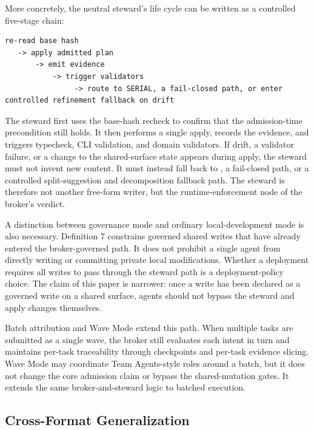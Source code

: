 \documentclass[9pt,letterpaper]{extarticle}
\begin{document}
More concretely, the neutral steward's life cycle can be written as a controlled five-stage chain:

\begin{paperAlgoBox}
\begin{Verbatim}[breaklines=true,fontsize=\scriptsize]
re-read base hash
   -> apply admitted plan
       -> emit evidence
           -> trigger validators
                -> route to SERIAL, a fail-closed path, or enter controlled refinement fallback on drift
\end{Verbatim}
\end{paperAlgoBox}

The steward first uses the base-hash recheck to confirm that the admission-time precondition still holds. It then performs a single apply, records the evidence, and triggers typecheck, CLI validation, and domain validators. If drift, a validator failure, or a change to the shared-surface state appears during apply, the steward must not invent new content. It must instead fall back to \texttt{}, a fail-closed path, or a controlled split-suggestion and decomposition fallback path. The steward is therefore not another free-form writer, but the runtime-enforcement node of the broker's verdict.

A distinction between governance mode and ordinary local-development mode is also necessary. Definition 7 constrains governed shared writes that have already entered the broker-governed path. It does not prohibit a single agent from directly writing or committing private local modifications. Whether a deployment requires all writes to pass through the steward path is a deployment-policy choice. The claim of this paper is narrower: once a write has been declared as a governed write on a shared surface, agents should not bypass the steward and apply changes themselves.

Batch attribution and Wave Mode extend this path. When multiple tasks are submitted as a single wave, the broker still evaluates each intent in turn and maintains per-task traceability through checkpoints and per-task evidence slicing. Wave Mode may coordinate Team Agents-style roles around a batch, but it does not change the core admission claim or bypass the shared-mutation gates. It extends the same broker-and-steward logic to batched execution.

\subsection{Cross-Format Generalization}
\end{document}
